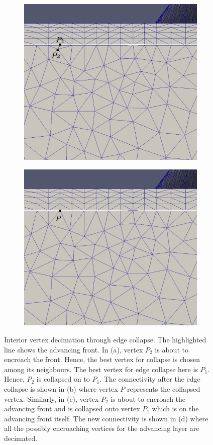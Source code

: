 \documentclass[conf]{new-aiaa}
\begin{document}
\begin{figure}[hbt!]
\begin{subfigure}{.5\textwidth}
  \caption{}
  \label{cc2}
\end{subfigure}
\begin{subfigure}{.5\textwidth}
  \centering
  \includegraphics[width=.9\linewidth]{interior-vert-collapse/cc3.eps}
  \caption{}
  \label{cc3}
\end{subfigure}%
\begin{subfigure}{.5\textwidth}
  \centering
  \includegraphics[width=.9\linewidth]{interior-vert-collapse/cc4.eps}
  \caption{}
  \label{cc4}
\end{subfigure}
\caption{Interior vertex decimation through edge collapse. The highlighted line shows the advancing front. In (a), vertex $P_2$ is about to encroach the front. Hence, the best vertex for collapse is chosen among its neighbours. The best vertex for edge collapse here is $P_1$. Hence, $P_2$ is collapsed on to $P_1$. The connectivity after the edge collapse is shown in (b) where vertex $P$ represents the collapsed vertex. Similarly, in (c), vertex $P_2$ is about to encroach the advancing front and is collapsed onto vertex $P_1$ which is on the advancing front itself. The new connectivity is shown in (d) where all the possibly encroaching vertices for the advancing layer are decimated.}

\end{figure}
\end{document}
